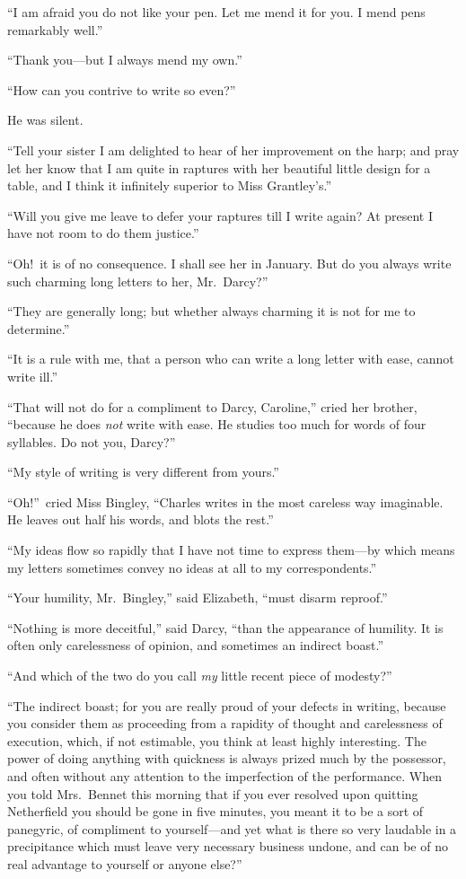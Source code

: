 \documentclass[12pt,english,oneside]{book}
\begin{document}
{}``I am afraid you do not like your pen. Let me mend it for you.
I mend pens remarkably well.''

{}``Thank you\mbox{---}but I always mend my own.''

{}``How can you contrive to write so even?''\ 

He was silent.

{}``Tell your sister I am delighted to hear of her improvement on
the harp; and pray let her know that I am quite in raptures with her
beautiful little design for a table, and I think it infinitely superior
to Miss Grantley's.''

{}``Will you give me leave to defer your raptures till I write again?
At present I have not room to do them justice.''

{}``Oh!\ it is of no consequence. I shall see her in January. But
do you always write such charming long letters to her, Mr.\ Darcy?''\ 

{}``They are generally long; but whether always charming it is not
for me to determine.''

{}``It is a rule with me, that a person who can write a long letter
with ease, cannot write ill.''

{}``That will not do for a compliment to Darcy, Caroline,'' cried
her brother, {}``because he does \textit{not} write with ease. He
studies too much for words of four syllables. Do not you, Darcy?''\ 

{}``My style of writing is very different from yours.''

{}``Oh!''\ cried Miss Bingley, {}``Charles writes in the most
careless way imaginable. He leaves out half his words, and blots the
rest.''

{}``My ideas flow so rapidly that I have not time to express them\mbox{---}by
which means my letters sometimes convey no ideas at all to my correspondents.''

{}``Your humility, Mr.\ Bingley,'' said Elizabeth, {}``must disarm
reproof.''

{}``Nothing is more deceitful,'' said Darcy, {}``than the appearance
of humility. It is often only carelessness of opinion, and sometimes
an indirect boast.''

{}``And which of the two do you call \textit{my} little recent piece
of modesty?''\ 

{}``The indirect boast; for you are really proud of your defects
in writing, because you consider them as proceeding from a rapidity
of thought and carelessness of execution, which, if not estimable,
you think at least highly interesting. The power of doing anything
with quickness is always prized much by the possessor, and often without
any attention to the imperfection of the performance. When you told
Mrs.\ Bennet this morning that if you ever resolved upon quitting
Netherfield you should be gone in five minutes, you meant it to be
a sort of panegyric, of compliment to yourself\mbox{---}and yet what
is there so very laudable in a precipitance which must leave very
necessary business undone, and can be of no real advantage to yourself
or anyone else?''\ 
\end{document}
